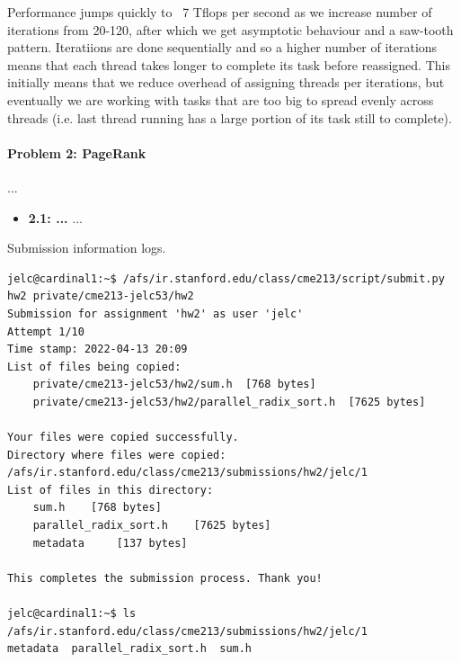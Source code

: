 \documentclass[12pt,letterpaper,twoside]{article}
\begin{document}
\begin{itemize}
    Performance jumps quickly to ~7 Tflops per second as we increase
    number of iterations from 20-120, after which we get asymptotic 
    behaviour and a saw-tooth pattern. Iteratiions are done sequentially
    and so a higher number of iterations means that each thread takes 
    longer to complete its task before reassigned. This initially means
    that we reduce overhead of assigning threads per iterations, but 
    eventually we are working with tasks that are too big to spread
    evenly across threads (i.e. last thread running has a large portion
    of its task still to complete).
    
\end{itemize}


\paragraph{Problem 2: PageRank} ...

\begin{itemize}
    \item \textbf{2.1: ...} ...


\end{itemize}


Submission information logs.
\begin{verbatim}
jelc@cardinal1:~$ /afs/ir.stanford.edu/class/cme213/script/submit.py hw2 private/cme213-jelc53/hw2
Submission for assignment 'hw2' as user 'jelc'
Attempt 1/10
Time stamp: 2022-04-13 20:09
List of files being copied:
    private/cme213-jelc53/hw2/sum.h	 [768 bytes]
    private/cme213-jelc53/hw2/parallel_radix_sort.h	 [7625 bytes]

Your files were copied successfully.
Directory where files were copied: /afs/ir.stanford.edu/class/cme213/submissions/hw2/jelc/1
List of files in this directory:
    sum.h	 [768 bytes]
    parallel_radix_sort.h	 [7625 bytes]
    metadata	 [137 bytes]

This completes the submission process. Thank you!

jelc@cardinal1:~$ ls /afs/ir.stanford.edu/class/cme213/submissions/hw2/jelc/1
metadata  parallel_radix_sort.h  sum.h
\end{verbatim}
\end{document}

